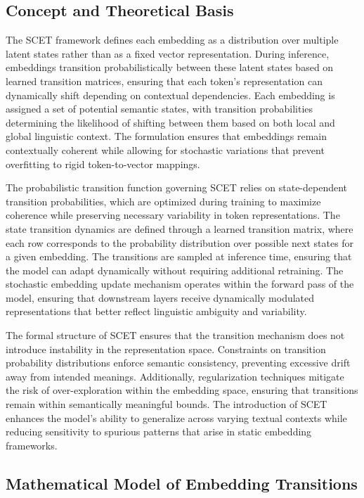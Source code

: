 \documentclass{article}
\begin{document}
\subsection{Concept and Theoretical Basis}

The SCET framework defines each embedding as a distribution over multiple latent states rather than as a fixed vector representation. During inference, embeddings transition probabilistically between these latent states based on learned transition matrices, ensuring that each token's representation can dynamically shift depending on contextual dependencies. Each embedding is assigned a set of potential semantic states, with transition probabilities determining the likelihood of shifting between them based on both local and global linguistic context. The formulation ensures that embeddings remain contextually coherent while allowing for stochastic variations that prevent overfitting to rigid token-to-vector mappings.

The probabilistic transition function governing SCET relies on state-dependent transition probabilities, which are optimized during training to maximize coherence while preserving necessary variability in token representations. The state transition dynamics are defined through a learned transition matrix, where each row corresponds to the probability distribution over possible next states for a given embedding. The transitions are sampled at inference time, ensuring that the model can adapt dynamically without requiring additional retraining. The stochastic embedding update mechanism operates within the forward pass of the model, ensuring that downstream layers receive dynamically modulated representations that better reflect linguistic ambiguity and variability.

The formal structure of SCET ensures that the transition mechanism does not introduce instability in the representation space. Constraints on transition probability distributions enforce semantic consistency, preventing excessive drift away from intended meanings. Additionally, regularization techniques mitigate the risk of over-exploration within the embedding space, ensuring that transitions remain within semantically meaningful bounds. The introduction of SCET enhances the model's ability to generalize across varying textual contexts while reducing sensitivity to spurious patterns that arise in static embedding frameworks.
\subsection{Mathematical Model of Embedding Transitions}
\end{document}
